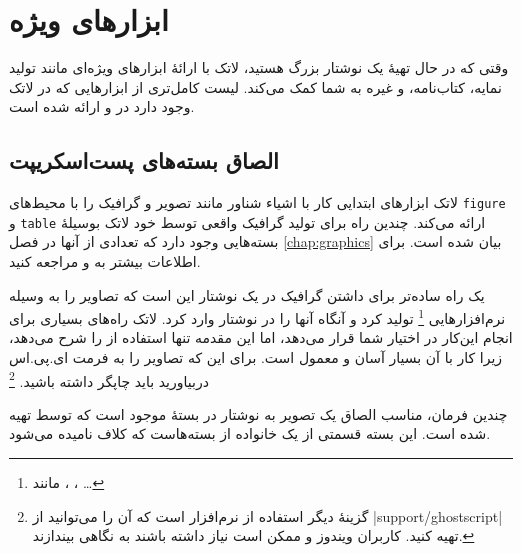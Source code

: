 \chapter{ابزارهای  ویژه}
\begin{intro}
وقتی که در حال تهیهٔ یک نوشتار‌ بزرگ هستید، لاتک با ارائهٔ ابزارهای ویژه‌ای مانند تولید نمایه، کتاب‌نامه، و غیره به شما کمک می‌کند. لیست کامل‌تری از  ابزار‌هایی که در لاتک وجود دارد در  
\manual{} و \companion
ارائه شده است.
\end{intro}
\section{الصاق بسته‌های پست‌اسکریپت}\label{eps}

لاتک ابزار‌های ابتدایی کار با اشیاء شناور مانند تصویر و گرافیک را با محیط‌های  \texttt{figure} و \texttt{table} ارائه می‌کند.
چندین راه برای تولید گرافیک واقعی توسط خود لاتک بوسیلهٔ بسته‌هایی وجود دارد که تعدادی از آنها در فصل  
\ref{chap:graphics}
بیان شده‌ است. برای اطلاعات بیشتر به  
 \manual{} و \companion{}مراجعه کنید.

یک راه ساده‌تر برای داشتن گرافیک در یک نوشتار‌ این است که تصاویر را به وسیله نرم‌\-افزارهایی%
\footnote{مانند ،  ، \ldots}
تولید کرد و آنگاه آنها را در نوشتار‌  وارد کرد. لاتک راه‌های بسیاری برای انجام این‌کار در اختیار شما قرار می‌دهد، اما این مقدمه تنها استفاده از  
\EPSi{}
 را شرح می‌دهد، زیرا کار با آن بسیار آسان و معمول است. برای این که تصاویر را به فرمت ای.پی.اس دربیاورید باید چاپگر  
\PSi
 داشته باشید.%
\footnote{گزینهٔ دیگر استفاده از  نرم‌افزار \textsc{} 
است که آن را می‌توانید از 
  \CTANref|support/ghostscript| تهیه کنید. کاربران ویندوز و  ممکن است نیاز داشته باشند به  \textsc{} نگاهی بیندازند.}

چندین فرمان، مناسب الصاق یک تصویر به نوشتار در بستهٔ 
 موجود است که توسط 
 تهیه شده است. این بسته قسمتی از یک خانواده از بسته‌هاست که کلاف 
نامیده می‌شود.%


